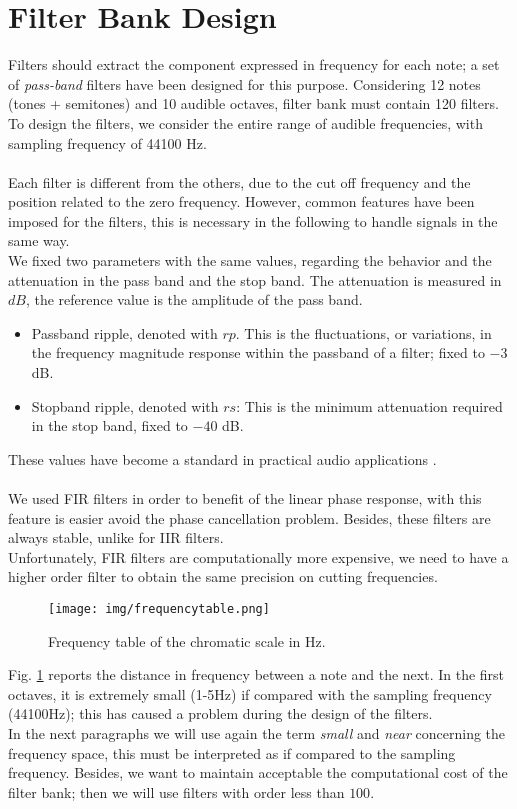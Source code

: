 \section{Filter Bank Design}
Filters should extract the component expressed in frequency for each note; a set of \textit{pass-band} filters have been designed for this purpose. Considering 12 notes (tones + semitones) and 10 audible octaves, filter bank must contain 120 filters.\\
To design the filters, we consider the entire range of audible frequencies, with sampling frequency of 44100 Hz. \\\\
Each filter is different from the others, due to the cut off frequency and the position related to the zero frequency. However, common features have been imposed for the filters, this is necessary in the following to handle signals in the same way.\\
We fixed two parameters with the same values, regarding the behavior and the attenuation in the pass band and the stop band. The attenuation is measured in $dB$, the reference value is the amplitude of the pass band.
\begin{itemize}
	\item Passband ripple, denoted with $rp$. This is the fluctuations, or variations, in the frequency magnitude response within the passband of a filter; fixed to $-3$ dB.
	\item Stopband ripple, denoted with $rs$: This is the minimum attenuation required in the stop band, fixed to $-40$ dB.
\end{itemize}
These values have become a standard in practical audio applications \cite{dsppratical}.\\\\
We used FIR filters in order to benefit of the linear phase response, with this feature is easier avoid the phase cancellation problem. Besides, these filters are always stable, unlike for IIR filters.\\
Unfortunately, FIR filters are computationally more expensive, we need to have a higher order filter to obtain the same precision on cutting frequencies.
\begin{figure}[H]\centering
\texttt{[image: img/frequencytable.png]} 
\caption{Frequency table of the chromatic scale in Hz.} \label{fig:frequencytable2}
\end{figure}
Fig. \ref{fig:frequencytable2} reports the distance in frequency between a note and the next. In the first octaves, it is extremely small (1-5Hz) if compared with the sampling frequency (44100Hz); this has caused a problem during the design of the filters.\\
In the next paragraphs we will use again the term \textit{small} and \textit{near} concerning the frequency space, this must be interpreted as if compared to the sampling frequency. Besides, we want to maintain acceptable the computational cost of the filter bank; then we will use filters with order less than $100$.


